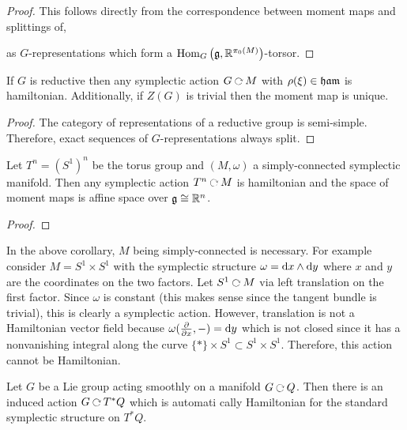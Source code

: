 \documentclass[12pt]{extarticle}
\newcommand{\R}{\mathbb{R}}
\begin{document}
\begin{proof}
This follows directly from the correspondence between moment maps and splittings of,
\begin{center}
\end{center}
as $G$-representations which form a $\Hom{G}{\g}{\R^{\pi_0(M)}}$-torsor.
\end{proof}

\begin{prop}
If $G$ is reductive then any symplectic action $G \acts M$ with $\rho(\xi) \in \mathfrak{ham}$ is hamiltonian. Additionally, if $Z(G)$ is trivial then the moment map is unique.
\end{prop}

\begin{proof}
The category of representations of a reductive group is semi-simple. Therefore, exact sequences of $G$-representations always split. 
\end{proof}

\begin{cor}
Let $T^n = (S^1)^n$ be the torus group and $(M, \omega)$ a simply-connected symplectic manifold. Then any symplectic action $T^n \acts M$ is hamiltonian and the space of moment maps is affine space over $\g \cong \R^n$.
\end{cor}

\begin{proof}

\end{proof}

\begin{example}
In the above corollary, $M$ being simply-connected is necessary. For example consider $M = S^1 \times S^1$ with the symplectic structure $\omega = \mathrm{d}{x} \wedge \mathrm{d}{y}$ where $x$ and $y$ are the coordinates on the two factors. Let $S^1 \acts M$ via left translation on the first factor. Since $\omega$ is constant (this makes sense since the tangent bundle is trivial), this is clearly a symplectic action. However, translation is not a Hamiltonian vector field because $\omega(\frac{\partial{}}{\partial{x}}, -) = \mathrm{d}{y}$ which is not closed since it has a nonvanishing integral along the curve $\{ * \} \times S^1 \subset S^1 \times S^1$. Therefore, this action cannot be Hamiltonian.
\end{example}

\begin{prop}
Let $G$ be a Lie group acting smoothly on a manifold $G \acts Q$. Then there is an induced action $G \acts T^* Q$ which is automati  cally Hamiltonian for the standard symplectic structure on $T^* Q$.
\end{prop}
\end{document}
